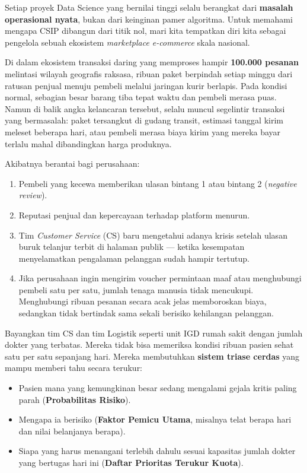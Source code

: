 \documentclass[11pt,a4paper,oneside]{book}
\begin{document}
Setiap proyek Data Science yang bernilai tinggi selalu berangkat dari \textbf{masalah operasional nyata}, bukan dari keinginan pamer algoritma. Untuk memahami mengapa CSIP dibangun dari titik nol, mari kita tempatkan diri kita sebagai pengelola sebuah ekosistem \emph{marketplace e-commerce} skala nasional.

Di dalam ekosistem transaksi daring yang memproses hampir \textbf{100.000 pesanan} melintasi wilayah geografis raksasa, ribuan paket berpindah setiap minggu dari ratusan penjual menuju pembeli melalui jaringan kurir berlapis. Pada kondisi normal, sebagian besar barang tiba tepat waktu dan pembeli merasa puas. Namun di balik angka kelancaran tersebut, selalu muncul segelintir transaksi yang bermasalah: paket tersangkut di gudang transit, estimasi tanggal kirim meleset beberapa hari, atau pembeli merasa biaya kirim yang mereka bayar terlalu mahal dibandingkan harga produknya.

Akibatnya berantai bagi perusahaan:
\begin{enumerate}
  \item Pembeli yang kecewa memberikan ulasan bintang 1 atau bintang 2 (\emph{negative review}).
  \item Reputasi penjual dan kepercayaan terhadap platform menurun.
  \item Tim \emph{Customer Service} (CS) baru mengetahui adanya krisis setelah ulasan buruk telanjur terbit di halaman publik --- ketika kesempatan menyelamatkan pengalaman pelanggan sudah hampir tertutup.
  \item Jika perusahaan ingin mengirim voucher permintaan maaf atau menghubungi pembeli satu per satu, jumlah tenaga manusia tidak mencukupi. Menghubungi ribuan pesanan secara acak jelas memboroskan biaya, sedangkan tidak bertindak sama sekali berisiko kehilangan pelanggan.
\end{enumerate}

\begin{bisnisbox}
Bayangkan tim CS dan tim Logistik seperti unit IGD rumah sakit dengan jumlah dokter yang terbatas. Mereka tidak bisa memeriksa kondisi ribuan pasien sehat satu per satu sepanjang hari. Mereka membutuhkan \textbf{sistem triase cerdas} yang mampu memberi tahu secara terukur:
\begin{itemize}
  \item Pasien mana yang kemungkinan besar sedang mengalami gejala kritis paling parah (\textbf{Probabilitas Risiko}).
  \item Mengapa ia berisiko (\textbf{Faktor Pemicu Utama}, misalnya telat berapa hari dan nilai belanjanya berapa).
  \item Siapa yang harus menangani terlebih dahulu sesuai kapasitas jumlah dokter yang bertugas hari ini (\textbf{Daftar Prioritas Terukur Kuota}).
\end{itemize}
\end{bisnisbox}
\end{document}
